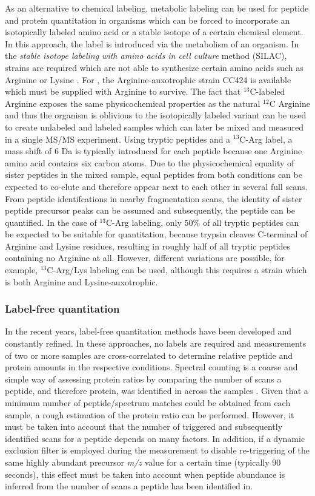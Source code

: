 As an alternative to chemical labeling, metabolic labeling can be used for
peptide and protein quantitation in organisms which can be forced to incorporate
an isotopically labeled amino acid or a stable isotope of a certain chemical 
element.
In this approach, the label is introduced via the metabolism of an organism.
In the {\em stable isotope labeling with amino acids in cell culture} method
(SILAC), strains are required which are not able to synthesize certain amino
acids such as Arginine or Lysine \citep{Ong2002}.
For \cre, the Arginine-auxotrophic strain CC424 is available which
must be supplied with Arginine to survive.
The fact that $^{13}$C-labeled Arginine exposes the same physicochemical 
properties as the natural $^{12}$C Arginine and thus the organism is 
oblivious to the isotopically labeled variant can be used to create 
unlabeled and labeled samples which can later be mixed and measured in a 
single MS/MS experiment.
Using tryptic peptides and a $^{13}$C-Arg label, a mass shift of 6 Da is 
typically introduced for each peptide because one Arginine amino acid 
contains six carbon atoms.
Due to the physicochemical equality of sister peptides in the mixed sample,
equal peptides from both conditions can be expected to co-elute and therefore
appear next to each other in several full scans. 
From peptide identifcations in nearby fragmentation scans, the identity of
sister peptide precursor peaks can be assumed and subsequently, the peptide
can be quantified.
In the case of $^{13}$C-Arg labeling, only 50\% of all tryptic peptides can
be expected to be suitable for quantitation, because trypsin cleaves C-terminal
of Arginine and Lysine residues, resulting in roughly half of all tryptic 
peptides containing no Arginine at all.
However, different variations are possible, for example, $^{13}$C-Arg/Lys 
labeling can be used, although this requires a strain which is both Arginine
and Lysine-auxotrophic.

\subsubsection{Label-free quantitation}

In the recent years, label-free quantitation methods have been developed and
constantly refined.
In these approaches, no labels are required and measurements of two or 
more samples are cross-correlated to determine relative peptide and protein
amounts in the respective conditions.
Spectral counting is a coarse and simple way of assessing protein ratios by
comparing the number of scans a peptide, and therefore protein, was identified
in across the samples \citep{Old2005}.
Given that a minimum number of peptide/spectrum matches could be obtained from
each sample, a rough estimation of the protein ratio can be performed.
However, it must be taken into account that the number of triggered and
subsequently identified scans for a peptide depends on many factors.
In addition, if a dynamic exclusion filter is employed during the measurement 
to disable re-triggering of the same highly abundant precursor {\em m/z} value 
for a certain time (typically 90 seconds), this effect must be taken into 
account when peptide abundance is inferred from the number of scans a peptide
has been identified in.

